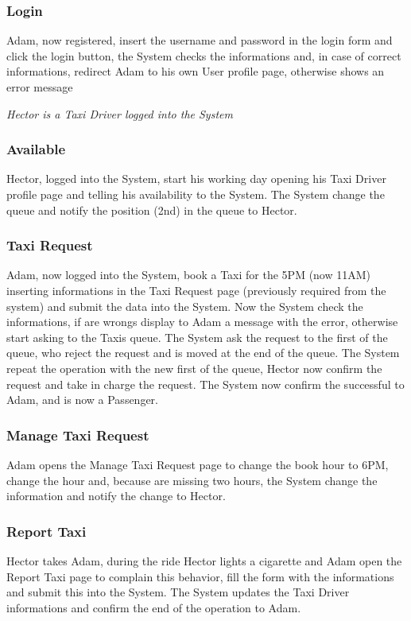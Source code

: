 \documentclass[english]{article}
\begin{document}
\subsubsection{Login}
Adam, now registered, insert the username and password in the login form and click the login button, the System checks the informations and, in case of correct informations, redirect Adam to his own User profile page, otherwise shows an error message

\emph{Hector is a Taxi Driver logged into the System}

\subsubsection{Available}
Hector, logged into the System, start his working day opening his Taxi Driver profile page and telling his availability to the System. The System change the queue and notify the position (2nd) in the queue to Hector.

\subsubsection{Taxi Request}
Adam, now logged into the System, book a Taxi for the 5PM (now 11AM) inserting informations in the Taxi Request page (previously required from the system) and submit the data into the System. Now the System check the informations, if are wrongs display to Adam a message with the error, otherwise start asking to the Taxis queue. The System ask the request to the first of the queue, who reject the request and is moved at the end of the queue. The System repeat the operation with the new first of the queue, Hector now confirm the request and take in charge the request. The System now confirm the successful to Adam, and is now a Passenger.

\subsubsection{Manage Taxi Request}
Adam opens the Manage Taxi Request page to change the book hour to 6PM, change the hour and, because are missing two hours, the System change the information and notify the change to Hector.

\subsubsection{Report Taxi}
Hector takes Adam, during the ride Hector lights a cigarette and Adam open the Report Taxi page to complain this behavior, fill the form with the informations and submit this into the System. The System updates the Taxi Driver informations and confirm the end of the operation to Adam.
\end{document}
